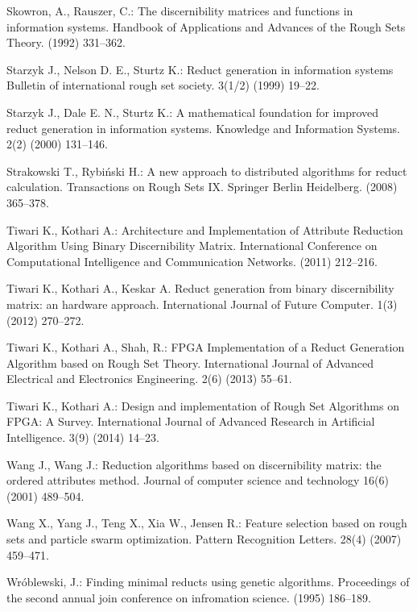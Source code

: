 \documentclass[11pt]{article}   %
\begin{document}
\begin{thebibliography}{}
	Skowron, A., Rauszer, C.:
	The discernibility matrices and functions in information systems. 
	Handbook of Applications and Advances of the Rough Sets Theory. (1992) 331--362.

	Starzyk J., Nelson D. E., Sturtz K.:
	Reduct generation in information systems
	Bulletin of international rough set society. 3(1/2) (1999) 19--22.

	Starzyk J., Dale E. N., Sturtz K.:
	A mathematical foundation for improved reduct generation in information systems.
	Knowledge and Information Systems. 2(2) (2000) 131--146.

	Strakowski T.,  Rybi\'nski H.:
	A new approach to distributed algorithms for reduct calculation.
	Transactions on Rough Sets IX. Springer Berlin Heidelberg. (2008) 365--378.

	Tiwari K., Kothari A.:
	Architecture and Implementation of Attribute Reduction Algorithm Using Binary Discernibility Matrix.
	International Conference on Computational Intelligence and Communication Networks. (2011) 212--216.

	Tiwari K., Kothari A., Keskar A.  
	Reduct generation from binary discernibility matrix: an hardware approach. 
	International Journal of Future Computer. 1(3) (2012) 270--272.

	Tiwari K., Kothari A., Shah, R.:
	FPGA Implementation of a Reduct Generation Algorithm based on Rough Set Theory. 
	International Journal of Advanced Electrical and Electronics Engineering. 2(6) (2013) 55--61.

	Tiwari K., Kothari A.:
	Design and implementation of Rough Set Algorithms on FPGA: A Survey.
	International Journal of Advanced Research in Artificial Intelligence. 3(9) (2014) 14--23.
		
	Wang J., Wang J.:
	Reduction algorithms based on discernibility matrix: the ordered attributes method.
	Journal of computer science and technology 16(6) (2001) 489--504.

	Wang X., Yang J., Teng X., Xia W., Jensen R.:
	Feature selection based on rough sets and particle swarm optimization.
	Pattern Recognition Letters. 28(4) (2007) 459--471.
	
	Wr\'oblewski, J.: 
	Finding minimal reducts using genetic algorithms.
	Proceedings of the second annual join conference on infromation science. (1995) 186--189.


\end{thebibliography}
\end{document}
